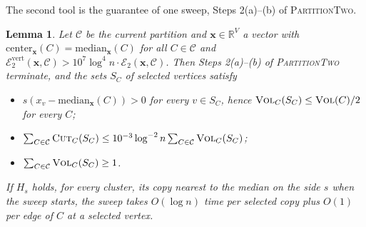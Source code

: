 \documentclass[11pt]{article}
\newtheorem{lemma}[theorem]{Lemma}
\theoremstyle{remark}
\newcommand{\xx}{\mathbf x}
\newcommand{\Ccal}{\mathcal{C}}
\newcommand{\Ecal}[1]{\mathcal E_{#1}}
\newcommand{\Ecalvert}[1]{\mathcal{E}^{\mathrm{vert}}_{#1}}
\newcommand{\R}{\mathbb R}
\newcommand{\vol}{\textsc{Vol}}
\newcommand{\cut}{\textsc{Cut}}
\begin{document}
The second tool is the guarantee of one sweep, Steps 2(a)--(b) of
\textsc{PartitionTwo}.

\begin{lemma}
\label{lem:sweep}
Let $\Ccal$ be the current partition and $\xx \in \R^{V}$ a vector with
$\mathrm{center}_{\xx}(C) = \mathrm{median}_{\xx}(C)$ for all $C \in \Ccal$
and
$\Ecalvert{2}(\xx, \Ccal) > 10^{7} \log^{4} n \cdot \Ecal{2}(\xx, \Ccal)$.
Then Steps 2(a)--(b) of \textsc{PartitionTwo} terminate, and the sets $S_C$
of selected vertices satisfy
\begin{itemize}
\item $s (x_v - \mathrm{median}_{\xx}(C)) > 0$ for every $v \in S_C$, hence
  $\vol_C(S_C) \le \vol(C)/2$ for every $C$;
\item $\sum_{C \in \Ccal} \cut_C(S_C)
  \le 10^{-3} \log^{-2} n \sum_{C \in \Ccal} \vol_C(S_C)$;
\item $\sum_{C \in \Ccal} \vol_C(S_C) \ge 1$.
\end{itemize}
If $H_s$ holds, for every cluster, its copy nearest to the median on the
side $s$ when the sweep starts, the sweep takes $O(\log n)$ time per
selected copy plus $O(1)$ per edge of $C$ at a selected vertex.
\end{lemma}
\end{document}
